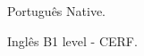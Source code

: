 

\begin{cvskills}

  \cvskill
    {Português} %
    {Native.} %

  \cvskill
    {Inglês} %
    {B1 level - CERF.} %
    


\end{cvskills}




